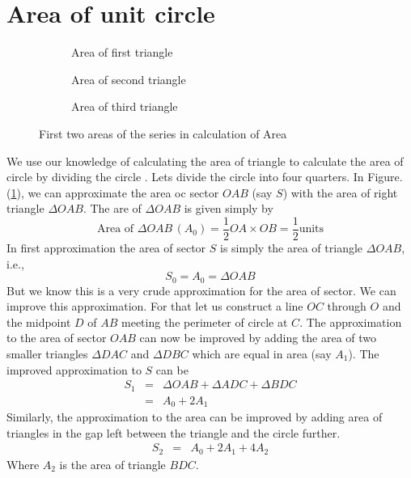 \documentclass{IEEEtran}
\theoremstyle{definition} \newtheorem{Definition}{Def{\,}inition}
\begin{document}
\section{Area of unit circle}


\begin{figure}
	\centering
	\def\f{0.4}
	\def\por{0.25}
	\begin{subfigure}[b]{\por \textwidth}
		\centering
		\scalebox{\f}{}
		\caption{Area of first triangle}
		\label{fig:a_0}
	\end{subfigure}%
	\begin{subfigure}[b]{\por \textwidth}
		\centering
		\scalebox{\f}{}
		\caption{Area of second triangle}
		\label{fig:a_1}
	\end{subfigure}
	\begin{subfigure}[b]{\por \textwidth}
		\centering
		\scalebox{\f}{}
		\caption{Area of third triangle}
		\label{fig:a_2}
	\end{subfigure}
	\caption{First two areas of the series in calculation of Area}
\end{figure}

We use our knowledge of calculating the area of triangle to calculate the area of circle by dividing the circle . Lets divide the circle into four quarters. In Figure.(\ref{fig:a_0}), we can approximate the area oc sector $OAB$ (say $S$) with the area of right triangle $\Delta OAB$. The are of $\Delta OAB$ is given simply by 
\[\text{Area of } \Delta OAB\, (A_0) = \frac{1}{2}OA \times OB = \frac{1}{2} \text{units} \]
In first approximation the area of sector $S $ is simply the area of triangle $\Delta OAB$, i.e., \[S_0 = A_0 = \Delta OAB\]
But we know this is a very crude approximation for the area of sector. We can improve this approximation. For that let us construct a line $OC$ through $O$ and the midpoint $D$ of $AB$ meeting the perimeter of circle at $C$. The approximation to the area of sector $OAB$ can now be improved by adding the area of two smaller triangles $\Delta DAC$ and $\Delta DBC$ which are equal in area (say $A_1$). The improved approximation to $S$  can be 
\begin{eqnarray}
    S_1 & = & \Delta OAB + \Delta ADC + \Delta BDC \nonumber \\
&=& A_0 + 2A_1 \nonumber
\end{eqnarray}
Similarly, the approximation to the area can be improved by adding area of triangles in the gap left between the triangle and the circle further.
\begin{eqnarray}
S_2& = & A_0 + 2A_1+4A_2 \nonumber
\end{eqnarray}
Where $A_2$ is the area of triangle $BDC$.
\end{document}
